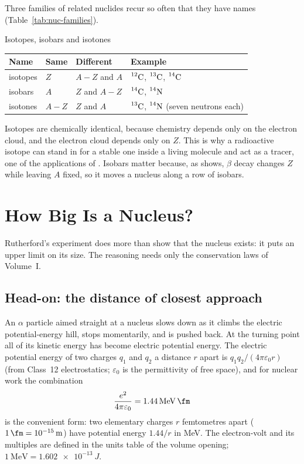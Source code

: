 \begin{figure}[htbp]
\centering
{}
\end{figure}

Three families of related nuclides recur so often that they have names (Table~\ref{tab:nuc-families}).
\begin{tablebox}{Isotopes, isobars and isotones}
\centering
\begin{tabular}{@{}llll@{}}\toprule
\textbf{Name} & \textbf{Same} & \textbf{Different} & \textbf{Example}\\\midrule
isotopes & $Z$ & $A-Z$ and $A$ & $\prescript{12}{}{\mathrm{C}}$, $\prescript{13}{}{\mathrm{C}}$, $\prescript{14}{}{\mathrm{C}}$\\
isobars & $A$ & $Z$ and $A-Z$ & $\prescript{14}{}{\mathrm{C}}$, $\prescript{14}{}{\mathrm{N}}$\\
isotones & $A-Z$ & $Z$ and $A$ & $\prescript{13}{}{\mathrm{C}}$, $\prescript{14}{}{\mathrm{N}}$ (seven neutrons each)\\\bottomrule
\end{tabular}\label{tab:nuc-families}
\end{tablebox}
Isotopes are chemically identical, because chemistry depends only on the electron cloud, and the
electron cloud depends only on $Z$. This is why a radioactive isotope can stand in for a stable one
inside a living molecule and act as a tracer, one of the applications of . Isobars
matter because, as  shows, $\beta$ decay changes $Z$ while leaving $A$ fixed, so it
moves a nucleus along a row of isobars.

\section{How Big Is a Nucleus?}\label{sec:nuc-size}

Rutherford's experiment does more than show that the nucleus exists: it puts an upper limit on its
size. The reasoning needs only the conservation laws of Volume~I.

\subsection{Head-on: the distance of closest approach}
An $\alpha$ particle aimed straight at a nucleus slows down as it climbs the electric potential-energy
hill, stops momentarily, and is pushed back. At the turning point all of its kinetic energy has become
electric potential energy. The electric potential energy of two charges $q_1$ and $q_2$ a distance $r$
apart is $q_1q_2/(4\pi\varepsilon_0 r)$ (from Class~12 electrostatics; $\varepsilon_0$ is the
permittivity of free space), and for nuclear work the combination
\[
\frac{e^2}{4\pi\varepsilon_0}=\SI{1.44}{\MeV.\fm}
\]
is the convenient form: two elementary charges $r$ femtometres apart ($\SI{1}{\fm}=\SI{e-15}{m}$) have
potential energy $1.44/r$ in \si{\MeV}. The electron-volt and its multiples are defined in the
units table of the volume opening; $\SI{1}{\MeV}=\SI{1.602e-13}{J}$.

